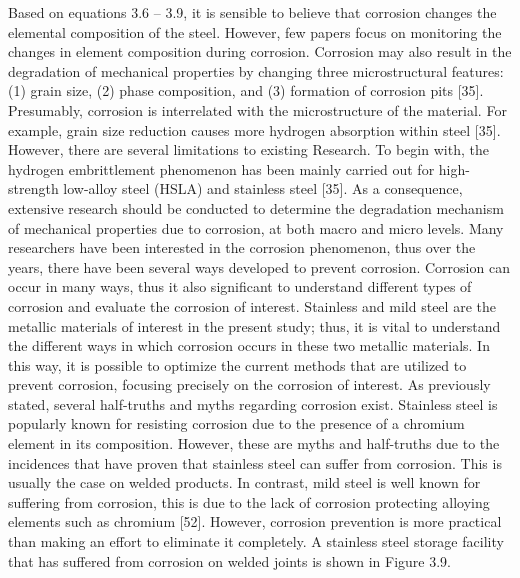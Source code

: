 \documentclass[12pt]{report}
\begin{document}
Based on equations 3.6 – 3.9, it is sensible to believe that corrosion changes the elemental composition of the steel. However, few papers focus on monitoring the changes in element composition during corrosion. Corrosion may also result in the degradation of mechanical properties by changing three microstructural features: (1) grain size, (2) phase composition, and (3) formation of corrosion pits [35]. Presumably, corrosion is interrelated with the microstructure of the material. For example, grain size reduction causes more hydrogen absorption within steel [35]. However, there are several limitations to existing Research. To begin with, the hydrogen embrittlement phenomenon has been mainly carried out for high-strength low-alloy steel (HSLA) and stainless steel [35]. As a consequence, extensive research should be conducted to determine the degradation mechanism of mechanical properties due to corrosion, at both macro and micro levels.  
Many researchers have been interested in the corrosion phenomenon, thus over the years, there have been several ways developed to prevent corrosion. Corrosion can occur in many ways, thus it also significant to understand different types of corrosion and evaluate the corrosion of interest. Stainless and mild steel are the metallic materials of interest in the present study; thus, it is vital to understand the different ways in which corrosion occurs in these two metallic materials. In this way, it is possible to optimize the current methods that are utilized to prevent corrosion, focusing precisely on the corrosion of interest.
As previously stated, several half-truths and myths regarding corrosion exist. Stainless steel is popularly known for resisting corrosion due to the presence of a chromium element in its composition. However, these are myths and half-truths due to the incidences that have proven that stainless steel can suffer from corrosion. This is usually the case on welded products. In contrast, mild steel is well known for suffering from corrosion, this is due to the lack of corrosion protecting alloying elements such as chromium [52]. However, corrosion prevention is more practical than making an effort to eliminate it completely. A stainless steel storage facility that has suffered from corrosion on welded joints is shown in Figure 3.9.
 
\end{document}
